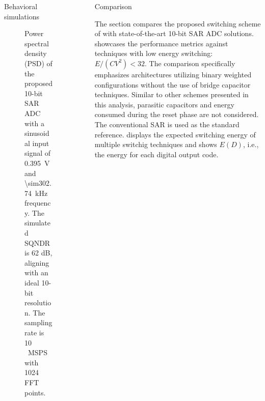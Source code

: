 \documentclass[final]{beamer}
\newlength{\sepwidth}
\newlength{\colwidth}
\newcommand{\separatorcolumn}{\begin{column}{\sepwidth}\end{column}}
\begin{document}
\begin{frame}[t]
\begin{columns}[t]
\begin{column}{\colwidth}
\begin{block}{Behavioral simulations}
    \begin{figure}[t] \centering
        \caption{Power spectral density (PSD) of the proposed 10-bit SAR ADC with a sinusoidal input signal of \SI{0.395}{\V} and \SI{\sim302.74}{\kHz} frequency. The simulated SQNDR is 62 dB, aligning with an ideal 10-bit resolution. The sampling rate is \SI{10}{\,MSPS} with 1024 FFT points.}
        \label{fig:psd}
    \end{figure}

\end{block}


\end{column}

\separatorcolumn

\begin{column}{\colwidth}

    \def\datasetED{datasets_/ED_expanded.csv}
    
    \begin{block}{Comparison}

    The section compares the proposed switching scheme of  with state-of-the-art 10-bit SAR ADC solutions. \label{sec:comp} showcases the performance metrics against techniques with low energy switching: $E/(C V^2)<32$. The comparison specifically emphasizes architectures utilizing binary weighted configurations without the use of bridge capacitor techniques. Similar to other schemes presented in this analysis, parasitic capacitors and energy consumed during the reset phase are not considered. The conventional SAR is used as the standard reference.  displays the expected switching energy of multiple switchig techniques and  shows $E(D)$, i.e., the energy for each digital output code.
    

\end{block}
\end{column}
\end{columns}
\end{frame}
\end{document}
